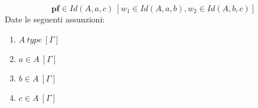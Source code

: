 \begin{displaymath}
    \textbf{pf} \in Id(A, a, c)\ [w_1 \in Id(A, a, b), w_2 \in Id(A, b, c)]
\end{displaymath}
Date le seguenti assunzioni:
\begin{enumerate}[label=$\pi_{\arabic*}$)]
    \item $A\ type\ [\Gamma]$
    \item $a \in A\ [\Gamma]$
    \item $b \in A\ [\Gamma]$
    \item $c \in A\ [\Gamma]$
\end{enumerate}